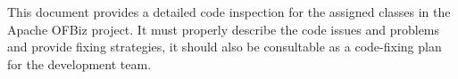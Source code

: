 This document provides a detailed code inspection for the assigned classes in the Apache OFBiz project. It must properly describe the code issues and problems and provide fixing strategies, it should also be consultable as a code-fixing plan for the development team.
